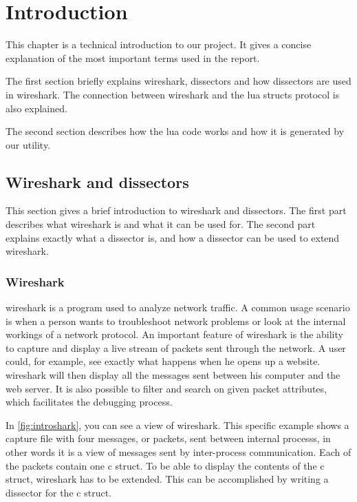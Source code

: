 \chapter*{Introduction}

This chapter is a technical introduction to our project.
It gives a concise explanation of the most important terms used in the report.

The first section briefly explains \Gls{wireshark}, \glspl{dissector} and how \glspl{dissector} are used in \Gls{wireshark}.
The connection between \Gls{wireshark} and the \Gls{lua} \glspl{struct} \gls{protocol} is also explained.

The second section describes how the \Gls{lua} code works and how it is generated by our \gls{utility}.

\section*{Wireshark and dissectors}
This section gives a brief introduction to \Gls{wireshark} and \glspl{dissector}.
The first part describes what \Gls{wireshark} is and what it can be used for.
The second part explains exactly what a \gls{dissector} is, and how a \gls{dissector} can be used to extend \Gls{wireshark}.

\subsection*{Wireshark}
\Gls{wireshark} is a program used to analyze network traffic. A common usage scenario is when a person wants to troubleshoot network problems or
look at the internal workings of a network \gls{protocol}. An important feature of \Gls{wireshark} is the ability to capture and display a live stream of \glspl{packet} sent through the network. 
A user could, for example, see exactly what happens when he opens up a website. \Gls{wireshark} will then display all the messages
sent between his computer and the web server. It is also possible to filter and search on given \gls{packet} attributes, which facilitates the debugging \gls{process}.

In \autoref{fig:introshark}, you can see a view of \Gls{wireshark}.
This specific example shows a capture file with four messages, or \glspl{packet}, sent between internal \glspl{process}, in other words
it is a view of messages sent by inter-\gls{process} communication. Each of the \glspl{packet} contain one \Gls{c} \gls{struct}.
To be able to display the contents of the \Gls{c} \gls{struct}, \Gls{wireshark} has to be extended. 
This can be accomplished by writing a \gls{dissector} for the \Gls{c} \gls{struct}.

